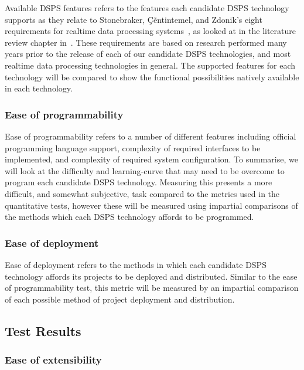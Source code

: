 Available DSPS features refers to the features each candidate DSPS technology supports as they relate to Stonebraker,
\c{C}\~entintemel, and Zdonik's eight requirements for realtime data processing systems~\cite{stonebraker_8_2005}, as looked at
in the literature review chapter in~. These requirements are based on research performed
many years prior to the release of each of our candidate DSPS technologies, and most realtime data processing technologies
in general. The supported features for each technology will be compared to show the functional possibilities natively
available in each technology.

\subsubsection{Ease of programmability}

Ease of programmability refers to a number of different features including official programming language support, complexity
of required interfaces to be implemented, and complexity of required system configuration. To summarise, we will look at
the difficulty and learning-curve that may need to be overcome to program each candidate DSPS technology. Measuring this
presents a more difficult, and somewhat subjective, task compared to the metrics used in the quantitative tests, however
these will be measured using impartial comparisons of the methods which each DSPS technology affords to be programmed.

\subsubsection{Ease of deployment}

Ease of deployment refers to the methods in which each candidate DSPS technology affords its projects to be deployed and distributed.
Similar to the ease of programmability test, this metric will be measured by an impartial comparison of each possible
method of project deployment and distribution.



\subsection{Test Results} %
\label{ssub:qual_test_results}

\subsubsection{Ease of extensibility}

